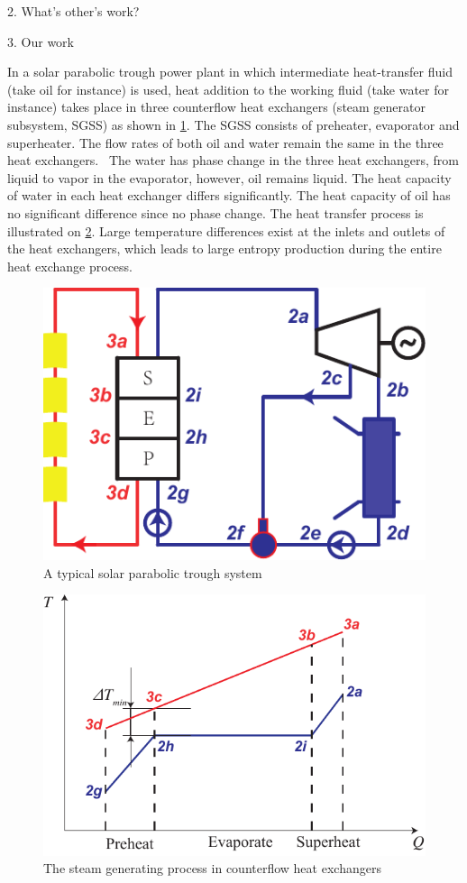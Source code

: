 \documentclass{article}
\begin{document}
2. What's other's work?

3. Our work

In a solar parabolic trough power plant in which intermediate heat-transfer fluid (take oil for instance) is used, heat addition to the working fluid (take water for instance) takes place in three counterflow heat exchangers (steam generator subsystem, SGSS) as shown in \ref{fig:PTC}. The SGSS consists of preheater, evaporator and superheater. The flow rates of both oil and water remain the same in the three heat exchangers.~\cite{Rovira2011}
The water has phase change in the three heat exchangers, from liquid to vapor in the evaporator, however, oil remains liquid. The heat capacity of water in each heat exchanger  differs significantly. The heat capacity of oil has no significant difference since no phase change. The heat transfer process is illustrated on \ref{fig:DeltaTmin}. Large temperature differences exist at the inlets and outlets of the heat exchangers, which leads to large entropy production during the entire heat exchange process.

\begin{figure}[htbp]
\centering
	\includegraphics[width = 0.4\columnwidth]{fig/PTC}
	\caption{A typical solar parabolic trough system}
	\label{fig:PTC}
\end{figure}
\begin{figure}[htbp]
\centering
	\includegraphics[width = 0.5\columnwidth]{fig/DeltaTmin}
	\caption{The steam generating process in counterflow heat exchangers}
	\label{fig:DeltaTmin}
\end{figure}

\end{document}
